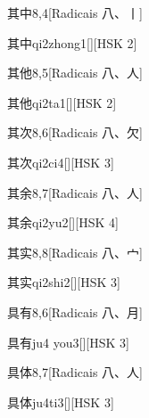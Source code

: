 \begin{entry}{其中}{8,4}[Radicais ⼋、⼁]
  \begin{phonetics}{其中}{qi2zhong1}[][HSK 2]
  \end{phonetics}
\end{entry}

\begin{entry}{其他}{8,5}[Radicais ⼋、⼈]
  \begin{phonetics}{其他}{qi2ta1}[][HSK 2]
  \end{phonetics}
\end{entry}

\begin{entry}{其次}{8,6}[Radicais ⼋、⽋]
  \begin{phonetics}{其次}{qi2ci4}[][HSK 3]
  \end{phonetics}
\end{entry}

\begin{entry}{其余}{8,7}[Radicais ⼋、⼈]
  \begin{phonetics}{其余}{qi2yu2}[][HSK 4]
  \end{phonetics}
\end{entry}

\begin{entry}{其实}{8,8}[Radicais ⼋、⼧]
  \begin{phonetics}{其实}{qi2shi2}[][HSK 3]
  \end{phonetics}
\end{entry}

\begin{entry}{具有}{8,6}[Radicais ⼋、⽉]
  \begin{phonetics}{具有}{ju4 you3}[][HSK 3]
  \end{phonetics}
\end{entry}

\begin{entry}{具体}{8,7}[Radicais ⼋、⼈]
  \begin{phonetics}{具体}{ju4ti3}[][HSK 3]
  \end{phonetics}
\end{entry}

